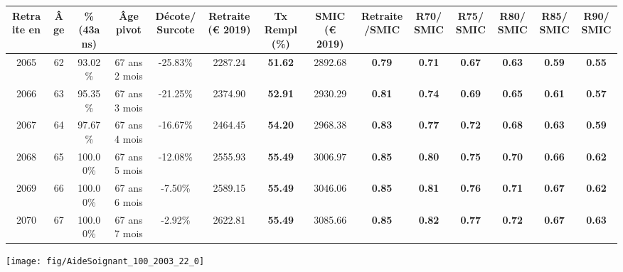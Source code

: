 \begin{adjustbox}{max width=\textwidth} 
\begin{tabular}[htb]{|c|c||c|c|c||c|c||c|c||c|c|c|c|c|} 
\hline 
 Retraite en &  Âge &  \%(43ans) &  Âge pivot &  Décote/Surcote &  Retraite (\euro{} 2019) &  Tx Rempl(\%) &  SMIC (\euro{} 2019) &  Retraite/SMIC &  R70/SMIC &  R75/SMIC &  R80/SMIC &  R85/SMIC &  R90/SMIC \\ 
\hline \hline 
 2065 &  62 &  93.02\% &  67 ans 2 mois &  -25.83\% &  2287.24 &  {\bf 51.62} &  2892.68 &  {\bf {\color{red} 0.79}} &  {\bf {\color{red} 0.71}} &  {\bf {\color{red} 0.67}} &  {\bf {\color{red} 0.63}} &  {\bf {\color{red} 0.59}} &  {\bf {\color{red} 0.55}} \\ 
\hline 
 2066 &  63 &  95.35\% &  67 ans 3 mois &  -21.25\% &  2374.90 &  {\bf 52.91} &  2930.29 &  {\bf {\color{red} 0.81}} &  {\bf {\color{red} 0.74}} &  {\bf {\color{red} 0.69}} &  {\bf {\color{red} 0.65}} &  {\bf {\color{red} 0.61}} &  {\bf {\color{red} 0.57}} \\ 
\hline 
 2067 &  64 &  97.67\% &  67 ans 4 mois &  -16.67\% &  2464.45 &  {\bf 54.20} &  2968.38 &  {\bf {\color{red} 0.83}} &  {\bf {\color{red} 0.77}} &  {\bf {\color{red} 0.72}} &  {\bf {\color{red} 0.68}} &  {\bf {\color{red} 0.63}} &  {\bf {\color{red} 0.59}} \\ 
\hline 
 2068 &  65 &  100.00\% &  67 ans 5 mois &  -12.08\% &  2555.93 &  {\bf 55.49} &  3006.97 &  {\bf {\color{red} 0.85}} &  {\bf {\color{red} 0.80}} &  {\bf {\color{red} 0.75}} &  {\bf {\color{red} 0.70}} &  {\bf {\color{red} 0.66}} &  {\bf {\color{red} 0.62}} \\ 
\hline 
 2069 &  66 &  100.00\% &  67 ans 6 mois &  -7.50\% &  2589.15 &  {\bf 55.49} &  3046.06 &  {\bf {\color{red} 0.85}} &  {\bf {\color{red} 0.81}} &  {\bf {\color{red} 0.76}} &  {\bf {\color{red} 0.71}} &  {\bf {\color{red} 0.67}} &  {\bf {\color{red} 0.62}} \\ 
\hline 
 2070 &  67 &  100.00\% &  67 ans 7 mois &  -2.92\% &  2622.81 &  {\bf 55.49} &  3085.66 &  {\bf {\color{red} 0.85}} &  {\bf {\color{red} 0.82}} &  {\bf {\color{red} 0.77}} &  {\bf {\color{red} 0.72}} &  {\bf {\color{red} 0.67}} &  {\bf {\color{red} 0.63}} \\ 
\hline 
\hline 
\end{tabular} 
\end{adjustbox} 
 
 \vspace{0.1cm} 

 {\hspace{-2.2cm}\texttt{[image: fig/AideSoignant\_100\_2003\_22\_0]}} 

